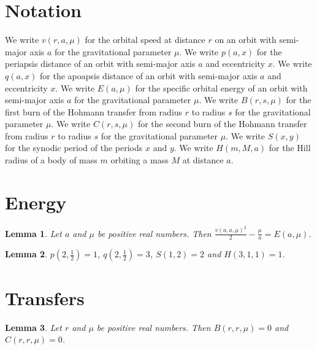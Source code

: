 \documentclass{article}
\newtheorem{lemma}{Lemma}
\begin{document}
\section{Notation}

We write $v(r,a,\mu)$ for the orbital speed at distance $r$ on an orbit with semi-major axis $a$ for the gravitational parameter $\mu$.
We write $p(a,x)$ for the periapsis distance of an orbit with semi-major axis $a$ and eccentricity $x$.
We write $q(a,x)$ for the apoapsis distance of an orbit with semi-major axis $a$ and eccentricity $x$.
We write $E(a,\mu)$ for the specific orbital energy of an orbit with semi-major axis $a$ for the gravitational parameter $\mu$.
We write $B(r,s,\mu)$ for the first burn of the Hohmann transfer from radius $r$ to radius $s$ for the gravitational parameter $\mu$.
We write $C(r,s,\mu)$ for the second burn of the Hohmann transfer from radius $r$ to radius $s$ for the gravitational parameter $\mu$.
We write $S(x,y)$ for the synodic period of the periods $x$ and $y$.
We write $H(m,M,a)$ for the Hill radius of a body of mass $m$ orbiting a mass $M$ at distance $a$.

\section{Energy}

\begin{lemma}\label{visviva}
Let $a$ and $\mu$ be positive real numbers. Then $\frac{v(a,a,\mu)^2}{2}-\frac{\mu}{a}=E(a,\mu)$.
\end{lemma}

\begin{lemma}\label{distances}
$p(2,\frac12)=1$, $q(2,\frac12)=3$, $S(1,2)=2$ and $H(3,1,1)=1$.
\end{lemma}

\section{Transfers}

\begin{lemma}\label{hohmann}
Let $r$ and $\mu$ be positive real numbers. Then $B(r,r,\mu)=0$ and $C(r,r,\mu)=0$.
\end{lemma}
\end{document}
